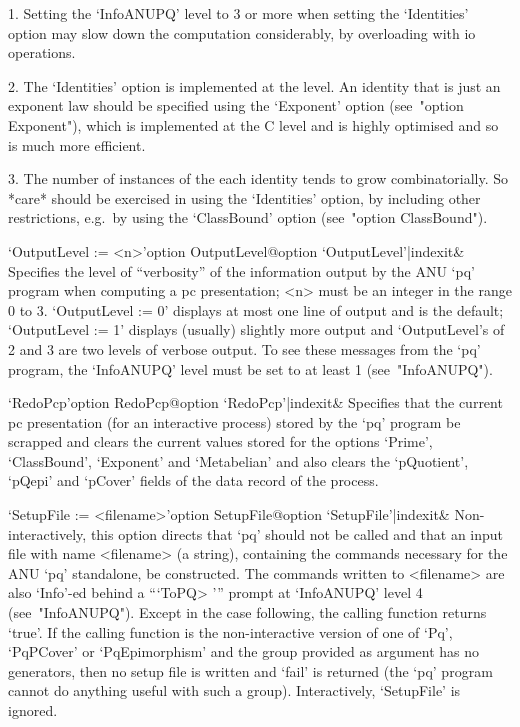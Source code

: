 \item{1.}
Setting the `InfoANUPQ' level to 3 or more when setting the  `Identities'
option may slow down the computation considerably, by overloading  {\GAP}
with io operations.

\item{2.}
The `Identities' option is implemented at the {\GAP} level.  An  identity
that is just an exponent law should be  specified  using  the  `Exponent'
option (see~"option Exponent"), which is implemented at the C  level  and
is highly optimised and so is much more efficient.

\item{3.}
The  number  of  instances  of  the   each   identity   tends   to   grow
combinatorially. So *care* should be exercised in using the  `Identities'
option, by including other restrictions, e.g.~by using  the  `ClassBound'
option (see~"option ClassBound").

\endlist

\>`OutputLevel := <n>'{option OutputLevel}@{option `OutputLevel'|indexit}&
Specifies the level of ``verbosity'' of the information output by the ANU
`pq' program when computing a pc presentation; <n> must be an integer  in
the range 0 to 3. `OutputLevel := 0' displays at most one line of  output
and is the default; `OutputLevel := 1' displays (usually)  slightly  more
output and `OutputLevel's of 2 and 3 are two levels of verbose output. To
see these messages from the `pq' program, the `InfoANUPQ' level  must  be
set to at least 1 (see~"InfoANUPQ").

\>`RedoPcp'{option RedoPcp}@{option `RedoPcp'|indexit}&
Specifies that the current pc presentation (for an  interactive  process)
stored by the `pq' program be scrapped  and  clears  the  current  values
stored for the options `Prime', `ClassBound', `Exponent' and `Metabelian'
and also clears the `pQuotient', `pQepi' and `pCover' fields of the  data
record of the process.

\>`SetupFile := <filename>'{option SetupFile}@{option `SetupFile'|indexit}&
Non-interactively, this option directs that `pq' should not be called and
that an input file  with  name  <filename>  (a  string),  containing  the
commands necessary for the  ANU  `pq'  standalone,  be  constructed.  The
commands written to <filename> are also `Info'-ed behind  a  ```ToPQ> '''
prompt at `InfoANUPQ' level  4  (see~"InfoANUPQ").  Except  in  the  case
following, the calling function returns `true'. If the  calling  function
is  the  non-interactive  version  of  one   of   `Pq',   `PqPCover'   or
`PqEpimorphism' and the group provided as  argument  has  no  generators,
then no setup file is written and `fail' is returned  (the  `pq'  program
cannot do anything useful with such a group). Interactively,  `SetupFile'
is ignored.


